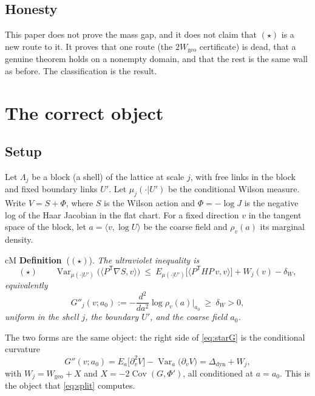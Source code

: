 \documentclass[11pt,a4paper]{article}
\newcounter{claim}
\newcommand{\claimhead}[2]{%
  \refstepcounter{claim}%
  \textbf{#1~\theclaim}#2\hspace{0.35em}\ignorespaces}
\begin{document}
\subsection{Honesty}

This paper does not prove the mass gap, and it does not claim that $(\star)$ is a new route to it.
It proves that one route (the $2W_{\mathrm{geo}}$ certificate) is dead, that a genuine theorem holds
on a nonempty domain, and that the rest is the same wall as before. The classification is the
result.

\section{The correct object}
\label{sec:object}

\subsection{Setup}

Let $\Lambda_j$ be a block (a shell) of the lattice at scale $j$, with free links in the block and
fixed boundary links $U'$. Let $\mu_j(\cdot|U')$ be the conditional Wilson measure. Write
$V=S+\Phi$, where $S$ is the Wilson action and $\Phi=-\log J$ is the negative log of the Haar
Jacobian in the flat chart. For a fixed direction $v$ in the tangent space of the block, let
$a=\langle v,\log U\rangle$ be the coarse field and $\rho_v(a)$ its marginal density.

\begin{claimbox}{cM}
\claimhead{Definition}{($(\star)$).} \emph{The ultraviolet inequality is}
\begin{equation}
(\star)\qquad
\operatorname{Var}_{\mu(\cdot|U')}\bigl(\langle P^{\mathsf T}\nabla S,v\rangle\bigr)
\ \le\ E_{\mu(\cdot|U')}\bigl[\langle P^{\mathsf T}H P\,v,v\rangle\bigr]+W_j(v)-\delta_W ,
\label{eq:star}
\end{equation}
\emph{equivalently}
\begin{equation}
G''_j(v;a_0):=-\frac{d^2}{da^2}\log\rho_v(a)\Big|_{a_0}
\ \ge\ \delta_W>0 ,
\label{eq:starG}
\end{equation}
\emph{uniform in the shell $j$, the boundary $U'$, and the coarse field $a_0$.}
\end{claimbox}

The two forms are the same object: the right side of \eqref{eq:starG} is the conditional curvature
\begin{equation}
G''(v;a_0)=E_a\bigl[\partial_v^2V\bigr]-\operatorname{Var}_a\bigl(\partial_vV\bigr)
=\Delta_{\mathrm{dyn}}+W_j ,
\label{eq:cond}
\end{equation}
with $W_j=W_{\mathrm{geo}}+X$ and $X=-2\operatorname{Cov}(G,\Phi')$, all conditioned at $a=a_0$.
This is the object that \eqref{eq:split} computes.
\end{document}
